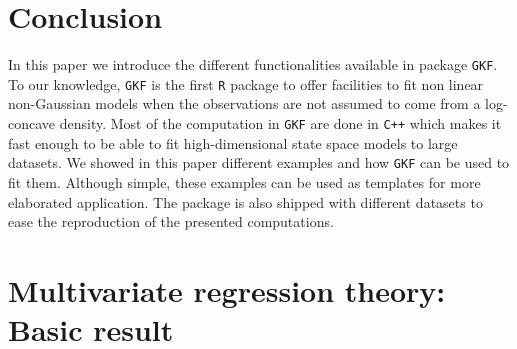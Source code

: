 \documentclass{article}
\newcommand{\R}{\texttt{R}\xspace}
\newcommand{\GKF}{\texttt{GKF}\xspace}
\begin{document}
\section{Conclusion}
\label{sec:CL}

In this paper we introduce the different functionalities available in package \GKF. To our
knowledge, \GKF is the first \R package to offer facilities to fit non linear non-Gaussian
models when the observations are not assumed to come from a log-concave density. Most of the
computation in \GKF are done in \texttt{C++} which makes it fast enough to be able to fit
high-dimensional state space models to large datasets. We showed in this paper different
examples and how \GKF can be used to fit them. Although simple, these examples can be used as
templates for more elaborated application. The package is also shipped with different
datasets to ease the reproduction of the presented computations.




\appendix

\section{Multivariate regression theory: Basic result}
\label{sec:MultiVNormal}
\end{document}
